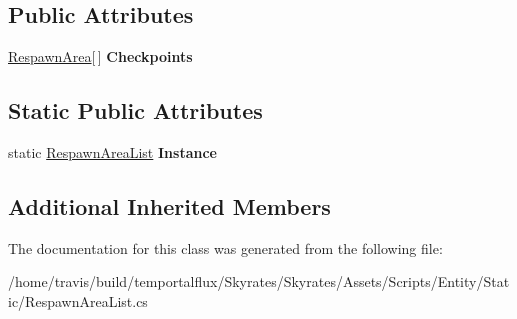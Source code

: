 \subsection*{Public Attributes}
\begin{DoxyCompactItemize}
\item 
\hypertarget{class_skyrates_1_1_respawn_1_1_respawn_area_list_a47319c66edcb1af97bfc207148d702a5}{\hyperlink{class_skyrates_1_1_respawn_1_1_respawn_area}{Respawn\-Area}\mbox{[}$\,$\mbox{]} {\bfseries Checkpoints}}\label{class_skyrates_1_1_respawn_1_1_respawn_area_list_a47319c66edcb1af97bfc207148d702a5}

\end{DoxyCompactItemize}
\subsection*{Static Public Attributes}
\begin{DoxyCompactItemize}
\item 
\hypertarget{class_skyrates_1_1_respawn_1_1_respawn_area_list_a173a98f204badd5f165b9046285d2810}{static \hyperlink{class_skyrates_1_1_respawn_1_1_respawn_area_list}{Respawn\-Area\-List} {\bfseries Instance}}\label{class_skyrates_1_1_respawn_1_1_respawn_area_list_a173a98f204badd5f165b9046285d2810}

\end{DoxyCompactItemize}
\subsection*{Additional Inherited Members}


The documentation for this class was generated from the following file\-:\begin{DoxyCompactItemize}
\item 
/home/travis/build/temportalflux/\-Skyrates/\-Skyrates/\-Assets/\-Scripts/\-Entity/\-Static/Respawn\-Area\-List.\-cs\end{DoxyCompactItemize}

